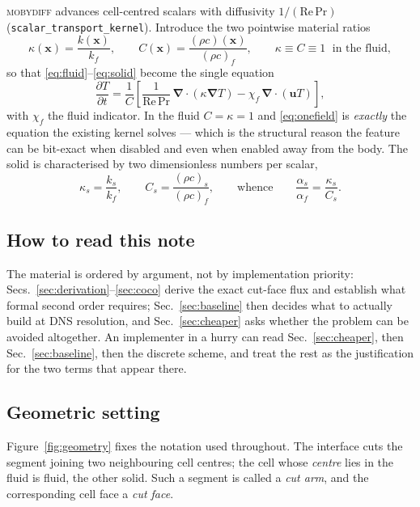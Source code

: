 \documentclass[11pt,a4paper]{article}
\newcommand{\grad}{\boldsymbol{\nabla}}
\newcommand{\code}[1]{\texttt{#1}}
\begin{document}
\textsc{mobydiff} advances cell-centred scalars with diffusivity
$1/(\mathrm{Re}\,\mathrm{Pr})$ (\code{scalar\_transport\_kernel}). Introduce the
two pointwise material ratios
\begin{equation}
  \kappa(\boldsymbol{x}) = \frac{k(\boldsymbol{x})}{k_f},
  \qquad
  C(\boldsymbol{x}) = \frac{(\rho c)(\boldsymbol{x})}{(\rho c)_f},
  \qquad
  \kappa \equiv C \equiv 1 \;\text{ in the fluid},
\end{equation}
so that \eqref{eq:fluid}--\eqref{eq:solid} become the single equation
\begin{equation}
  \frac{\partial T}{\partial t}
  = \frac{1}{C}\left[
      \frac{1}{\mathrm{Re}\,\mathrm{Pr}}\,\grad\!\cdot\!\left(\kappa\grad T\right)
      - \chi_f\,\grad\!\cdot(\boldsymbol{u}T)
    \right],
  \label{eq:onefield}
\end{equation}
with $\chi_f$ the fluid indicator. In the fluid $C=\kappa=1$ and
\eqref{eq:onefield} is \emph{exactly} the equation the existing kernel solves ---
which is the structural reason the feature can be bit-exact when disabled and
even when enabled away from the body. The solid is characterised by two
dimensionless numbers per scalar,
\begin{equation}
  \kappa_s = \frac{k_s}{k_f},
  \qquad
  C_s = \frac{(\rho c)_s}{(\rho c)_f},
  \qquad\text{whence}\qquad
  \frac{\alpha_s}{\alpha_f}=\frac{\kappa_s}{C_s}.
\end{equation}

\subsection{How to read this note}

The material is ordered by argument, not by implementation priority:
Secs.~\ref{sec:derivation}--\ref{sec:coco} derive the exact cut-face flux and
establish what formal second order requires;
Sec.~\ref{sec:baseline} then decides what to actually build at DNS resolution,
and Sec.~\ref{sec:cheaper} asks whether the problem can be avoided altogether.
An implementer in a hurry can read Sec.~\ref{sec:cheaper}, then
Sec.~\ref{sec:baseline}, then the discrete scheme, and treat the rest as the
justification for the two terms that appear there.

\subsection{Geometric setting}

Figure~\ref{fig:geometry} fixes the notation used throughout. The interface cuts
the segment joining two neighbouring cell centres; the cell whose \emph{centre}
lies in the fluid is fluid, the other solid. Such a segment is called a
\emph{cut arm}, and the corresponding cell face a \emph{cut face}.
\end{document}
